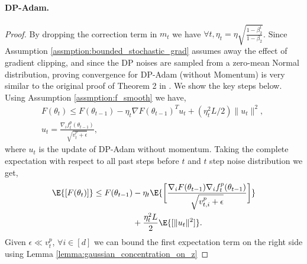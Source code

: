 \documentclass[letterpaper]{article} %
\begin{document}
\paragraph{DP-Adam.}
\begin{proof}
    By dropping the correction term in $m_t$ we have $\forall t, \eta_t = \eta\sqrt{\frac{1-\beta_2^t}{1-\beta_2}}$. Since Assumption \ref{assmption:bounded_stochastic_grad} assumes away the effect of gradient clipping, and since the DP noises are sampled from a zero-mean Normal distribution, proving convergence for DP-Adam (without Momentum) is very similar to the original proof of Theorem 2 in \citep{défossez2022simple}.
    We show the key steps below. Using Assumption \ref{assmption:f_smooth} we have,
    \begin{gather*}
        F(\theta_t) \leq F(\theta_{t-1}) - \eta_t \nabla F(\theta_{t-1})^T u_t + (\eta_t^2 L/2) \lVert u_t \rVert^2, \; \\
        u_t = \frac{\nabla_i f_t^{p}(\theta_{t-1})}{\sqrt{v_t^{p} + \epsilon}},
    \end{gather*}
    where $u_t$ is the update of DP-Adam without momentum.
    Taking the complete expectation with respect to all past steps before $t$ and $t$ step noise distribution we get,
    \begin{align*}
        \E{[F(\theta_t)]} \leq F(\theta_{t-1}) &- \eta_t \E{\bigg[\frac{\nabla_i F(\theta_{t-1}) \nabla_i f_t^{p}(\theta_{t-1})}{\sqrt{v_{t, i}^{p} + \epsilon }}\bigg]} \\ &+ \frac{\eta_t^2 L}{2}\E{[\lVert u_t \rVert^2]}.
    \end{align*}
    Given $\epsilon \ll v_t^p$, $\forall i \in [d]$  we can bound the first expectation term on the right side using Lemma \ref{lemma:gaussian_concentration_on_z}

\end{proof}
\end{document}

